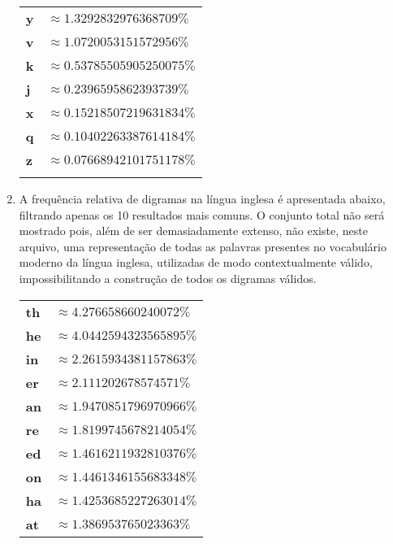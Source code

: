 \documentclass{../sftex/sftex}
\begin{document}
\begin{enumerate}
\begin{center}
\begin{minipage}{.33\linewidth}
\begin{tabular}{>{\bfseries}ll}
                y & $\approx 1.3292832976368709\%$     \\
                v & $\approx 1.0720053151572956\%$     \\
                k & $\approx 0.53785505905250075\%$    \\
                j & $\approx 0.2396595862393739\%$     \\
                x & $\approx 0.15218507219631834\%$    \\
                q & $\approx 0.10402263387614184\%$    \\
                z & $\approx 0.07668942101751178\%$    \\
                  &                                    \\
            \end{tabular}
        \end{minipage}
    \end{center}

    \item A frequência relativa de digramas na língua inglesa é apresentada
        abaixo, filtrando apenas os 10 resultados mais comuns. O conjunto
        total não será mostrado pois, além de ser demasiadamente extenso, não
        existe, neste arquivo, uma representação de todas as palavras
        presentes no vocabulário moderno da língua inglesa, utilizadas de modo
        contextualmente válido, impossibilitando a construção de todos os
        digramas válidos.

    \begin{center}
        \begin{tabular}{>{\bfseries}ll}
            th & $\approx 4.276658660240072\%$     \\
            he & $\approx 4.0442594323565895\%$    \\
            in & $\approx 2.2615934381157863\%$    \\
            er & $\approx 2.111202678574571\%$     \\
            an & $\approx 1.9470851796970966\%$    \\
            re & $\approx 1.8199745678214054\%$    \\
            ed & $\approx 1.4616211932810376\%$    \\
            on & $\approx 1.4461346155683348\%$    \\
            ha & $\approx 1.4253685227263014\%$    \\
            at & $\approx 1.386953765023363\%$     \\
        \end{tabular}
    \end{center}

\end{enumerate}
\end{document}
